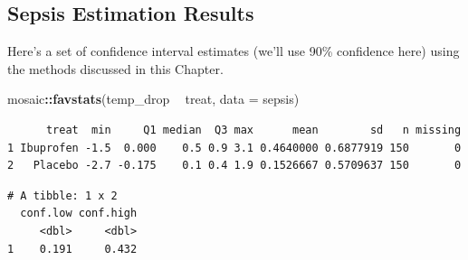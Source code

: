 \documentclass[
]{book}
\newenvironment{Shaded}{\begin{snugshade}}{\end{snugshade}}
\newcommand{\DataTypeTok}[1]{\textcolor[rgb]{0.13,0.29,0.53}{#1}}
\newcommand{\FloatTok}[1]{\textcolor[rgb]{0.00,0.00,0.81}{#1}}
\newcommand{\KeywordTok}[1]{\textcolor[rgb]{0.13,0.29,0.53}{\textbf{#1}}}
\newcommand{\NormalTok}[1]{#1}
\newcommand{\OperatorTok}[1]{\textcolor[rgb]{0.81,0.36,0.00}{\textbf{#1}}}
\newcommand{\OtherTok}[1]{\textcolor[rgb]{0.56,0.35,0.01}{#1}}
\newcommand{\StringTok}[1]{\textcolor[rgb]{0.31,0.60,0.02}{#1}}
\begin{document}
\hypertarget{sepsis-estimation-results}{%
\subsection{Sepsis Estimation Results}\label{sepsis-estimation-results}}

Here's a set of confidence interval estimates (we'll use 90\% confidence here) using the methods discussed in this Chapter.

\begin{Shaded}
\begin{Highlighting}[]
\NormalTok{mosaic}\OperatorTok{::}\KeywordTok{favstats}\NormalTok{(temp_drop }\OperatorTok{~}\StringTok{ }\NormalTok{treat, }\DataTypeTok{data =}\NormalTok{ sepsis)}
\end{Highlighting}
\end{Shaded}

\begin{verbatim}
      treat  min     Q1 median  Q3 max      mean        sd   n missing
1 Ibuprofen -1.5  0.000    0.5 0.9 3.1 0.4640000 0.6877919 150       0
2   Placebo -2.7 -0.175    0.1 0.4 1.9 0.1526667 0.5709637 150       0
\end{verbatim}

\begin{Shaded}
\end{Shaded}

\begin{verbatim}
# A tibble: 1 x 2
  conf.low conf.high
     <dbl>     <dbl>
1    0.191     0.432
\end{verbatim}

\begin{Shaded}
\end{Shaded}
\end{document}
